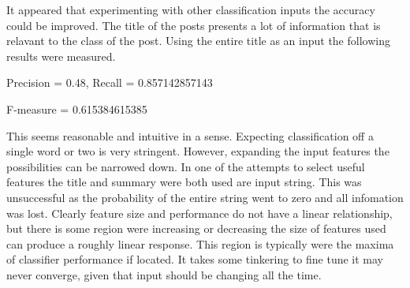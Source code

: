 It appeared that experimenting with other classification inputs the accuracy could be improved. The title of the posts presents a lot of information that is relavant to the class of the post. Using the entire title as an input the following results were measured.

\begin{center}
Precision = 0.48, Recall =  0.857142857143

F-measure = 0.615384615385
\end{center}

This seems reasonable and intuitive in a sense. Expecting classification off a single word or two is very stringent. However, expanding the input features the possibilities can be narrowed down. In one of the attempts to select useful features the title and summary were both used are input string. This was unsuccessful as the probability of the entire string went to zero and all infomation was lost. Clearly feature size and performance do not have a linear relationship, but there is some region were increasing or decreasing the size of features used can produce a roughly linear response. This region is typically were the maxima of classifier performance if located. It takes some tinkering to fine tune it may never converge, given that input should be changing all the time. 



